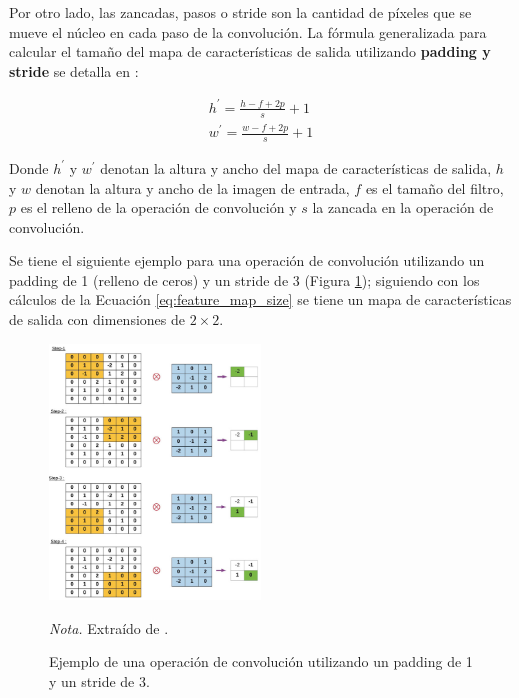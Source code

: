 Por otro lado, las zancadas, pasos o stride son la cantidad de píxeles que se mueve el núcleo en cada paso de la convolución. La fórmula generalizada para calcular el tamaño del mapa de características de salida utilizando 
\textbf{padding y stride} se detalla en \citet{balas_recent_2020}:

\begin{subequations}
    \begin{gather}
        h^{'} = \frac{h- f + 2p}{s} + 1 \\
        w^{'} = \frac{w- f + 2p}{s} + 1        
    \end{gather}
    \label{eq:feature_map_size}
\end{subequations}

Donde $h^{'}$ y $w^{'}$ denotan la altura y ancho del mapa de características de salida, $h$  y $w$ denotan la altura y ancho de la imagen de entrada, 
$f$ es el tamaño del filtro, $p$ es el relleno de la operación de convolución y $s$ la zancada en la operación de convolución.

Se tiene el siguiente ejemplo para una operación de convolución utilizando un padding de 1 (relleno de ceros)
y un stride de 3 (Figura \ref{fig:padding_stride}); siguiendo con los cálculos de la Ecuación \ref{eq:feature_map_size} se tiene un mapa de características 
de salida con dimensiones de $2\times2$.
\begin{figure}[H]
    \centering
    \caption{Ejemplo de una operación de convolución utilizando un padding de 1 y un stride de 3.}
    \includegraphics[width=0.5\textwidth]{img/4_marco_teorico/padding_stride.png}
    \label{fig:padding_stride}
    \begin{flushleft}
        \textit{Nota.} Extraído de \citet{balas_recent_2020}. 
        \vspace{-\baselineskip}       
    \end{flushleft}    
\end{figure}

